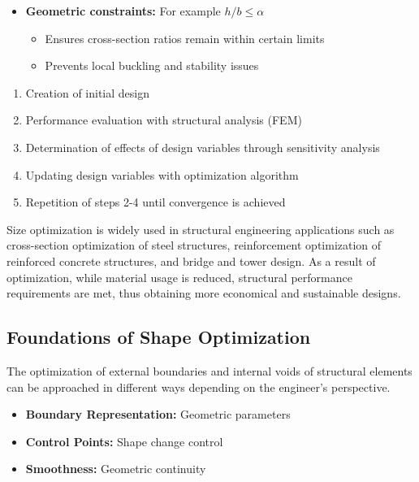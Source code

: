 \begin{itemize}
    \item \textbf{Geometric constraints:} For example $h/b \leq \alpha$
    \begin{itemize}
        \item Ensures cross-section ratios remain within certain limits
        \item Prevents local buckling and stability issues
    \end{itemize}
\end{itemize}

\begin{tcolorbox}[title=Size Optimization Process]
\begin{enumerate}
    \item Creation of initial design
    \item Performance evaluation with structural analysis (FEM)
    \item Determination of effects of design variables through sensitivity analysis
    \item Updating design variables with optimization algorithm
    \item Repetition of steps 2-4 until convergence is achieved
\end{enumerate}
\end{tcolorbox}

Size optimization is widely used in structural engineering applications such as cross-section optimization of steel structures, reinforcement optimization of reinforced concrete structures, and bridge and tower design. As a result of optimization, while material usage is reduced, structural performance requirements are met, thus obtaining more economical and sustainable designs.

\subsection{Foundations of Shape Optimization}
The optimization of external boundaries and internal voids of structural elements can be approached in different ways depending on the engineer's perspective.

\begin{itemize}
    \item \textbf{Boundary Representation:} Geometric parameters
    \item \textbf{Control Points:} Shape change control
    \item \textbf{Smoothness:} Geometric continuity
\end{itemize}

